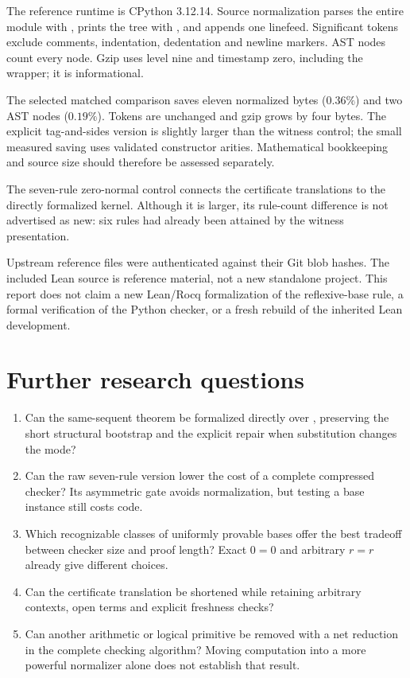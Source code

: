 The reference runtime is CPython 3.12.14. Source normalization parses the
entire module with , prints the tree with
, and appends one linefeed.
Significant tokens exclude comments, indentation, dedentation and newline
markers. AST nodes count every  node. Gzip uses level nine
and timestamp zero, including the wrapper; it is informational.


The selected matched comparison saves eleven normalized bytes
(\(0.36\%\)) and two AST nodes (\(0.19\%\)). Tokens are unchanged and
gzip grows by four bytes. The explicit tag-and-sides version is slightly
larger than the witness control; the small measured saving uses
validated constructor arities. Mathematical bookkeeping and source
size should therefore be assessed separately.

The seven-rule zero-normal control connects the certificate translations
to the directly formalized kernel. Although it is larger, its rule-count
difference is not advertised as new: six rules had already been attained
by the witness presentation.


Upstream reference files were authenticated against their Git blob hashes.
The included Lean source is reference material, not a new standalone
project. This report does not claim a new Lean/Rocq formalization of the
reflexive-base rule, a formal verification of the Python checker, or a
fresh rebuild of the inherited Lean development.

\section{Further research questions}

\begin{enumerate}
\item Can the same-sequent theorem be formalized directly over
, preserving the short structural bootstrap
and the explicit repair when substitution changes the mode?
\item Can the raw seven-rule version lower the cost of a complete
compressed checker? Its asymmetric gate avoids normalization, but
testing a base instance still costs code.
\item Which recognizable classes of uniformly provable bases offer
the best tradeoff between checker size and proof length? Exact
\(0=0\) and arbitrary \(r=r\) already give different choices.
\item Can the certificate translation be shortened while retaining
arbitrary contexts, open terms and explicit freshness checks?
\item Can another arithmetic or logical primitive be removed with a
net reduction in the complete checking algorithm? Moving computation
into a more powerful normalizer alone does not establish that result.
\end{enumerate}


